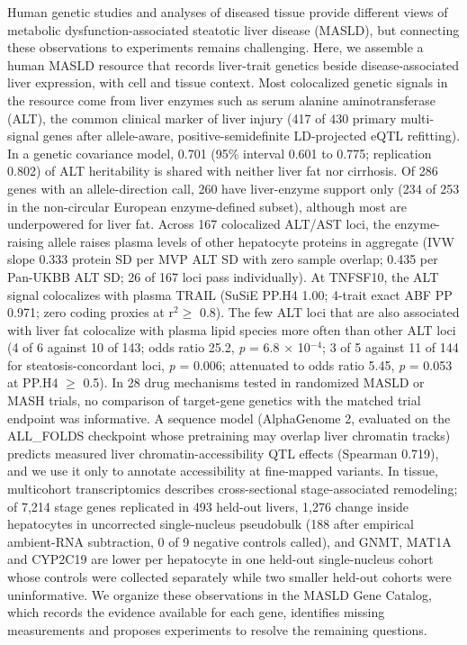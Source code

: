 \label{summary}

Human genetic studies and analyses of diseased tissue provide different views of metabolic dysfunction-associated steatotic liver disease (MASLD), but connecting these observations to experiments remains challenging. Here, we assemble a human MASLD resource that records liver-trait genetics beside disease-associated liver expression, with cell and tissue context. Most colocalized genetic signals in the resource come from liver enzymes such as serum alanine aminotransferase (ALT), the common clinical marker of liver injury (417 of 430 primary multi-signal genes after allele-aware, positive-semidefinite LD-projected eQTL refitting). In a genetic covariance model, 0.701 (95\% interval 0.601 to 0.775; replication 0.802) of ALT heritability is shared with neither liver fat nor cirrhosis. Of 286 genes with an allele-direction call, 260 have liver-enzyme support only (234 of 253 in the non-circular European enzyme-defined subset), although most are underpowered for liver fat. Across 167 colocalized ALT/AST loci, the enzyme-raising allele raises plasma levels of other hepatocyte proteins in aggregate (IVW slope 0.333 protein SD per MVP ALT SD with zero sample overlap; 0.435 per Pan-UKBB ALT SD; 26 of 167 loci pass individually). At TNFSF10, the ALT signal colocalizes with plasma TRAIL (SuSiE PP.H4 1.00; 4-trait exact ABF PP 0.971; zero coding proxies at r$^2 \ge$ 0.8). The few ALT loci that are also associated with liver fat colocalize with plasma lipid species more often than other ALT loci (4 of 6 against 10 of 143; odds ratio 25.2, \emph{p} = 6.8 $\times$ 10$^{-4}$; 3 of 5 against 11 of 144 for steatosis-concordant loci, \emph{p} = 0.006; attenuated to odds ratio 5.45, \emph{p} = 0.053 at PP.H4 $\ge$ 0.5). In 28 drug mechanisms tested in randomized MASLD or MASH trials, no comparison of target-gene genetics with the matched trial endpoint was informative. A sequence model (AlphaGenome 2, evaluated on the ALL\_FOLDS checkpoint whose pretraining may overlap liver chromatin tracks) predicts measured liver chromatin-accessibility QTL effects (Spearman 0.719), and we use it only to annotate accessibility at fine-mapped variants. In tissue, multicohort transcriptomics describes cross-sectional stage-associated remodeling; of 7,214 stage genes replicated in 493 held-out livers, 1,276 change inside hepatocytes in uncorrected single-nucleus pseudobulk (188 after empirical ambient-RNA subtraction, 0 of 9 negative controls called), and GNMT, MAT1A and CYP2C19 are lower per hepatocyte in one held-out single-nucleus cohort whose controls were collected separately while two smaller held-out cohorts were uninformative. We organize these observations in the MASLD Gene Catalog, which records the evidence available for each gene, identifies missing measurements and proposes experiments to resolve the remaining questions.
